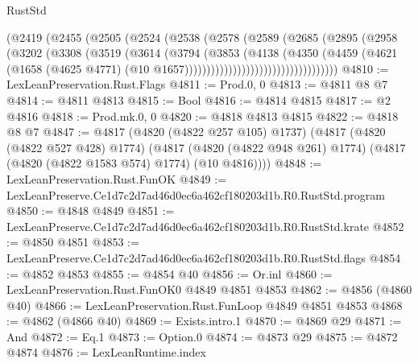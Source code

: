 \begin{lexlean}{RustStd}
\begin{coremodule}
                              (@2419
                                (@2455
                                  (@2505
                                    (@2524
                                      (@2538
                                        (@2578
                                          (@2589
                                            (@2685
                                              (@2895
                                                (@2958
                                                  (@3202
                                                    (@3308
                                                      (@3519
                                                        (@3614
                                                          (@3794
                                                            (@3853
                                                              (@4138
                                                                (@4350
                                                                  (@4459
                                                                    (@4621
                                                                      (@1658
                                                                        (@4625 @4771)
                                                                        (@10
                                                                          @1657)))))))))))))))))))))))))))))))))))
@4810 := LexLeanPreservation.Rust.Flags
@4811 := Prod.{0, 0}
@4813 := @4811 @8 @7
@4814 := @4811 @4813
@4815 := Bool
@4816 := @4814 @4815
@4817 := @2 @4816
@4818 := Prod.mk.{0, 0}
@4820 := @4818 @4813 @4815
@4822 := @4818 @8 @7
@4847 := @4817
    (@4820 (@4822 @257 @105) @1737)
    (@4817
      (@4820 (@4822 @527 @428) @1774)
      (@4817 (@4820 (@4822 @948 @261) @1774) (@4817 (@4820 (@4822 @1583 @574) @1774) (@10 @4816))))
@4848 := LexLeanPreservation.Rust.FunOK
@4849 := LexLeanPreserve.Ce1d7c2d7ad46d0ec6a462cf180203d1b.R0.RustStd.program
@4850 := @4848 @4849
@4851 := LexLeanPreserve.Ce1d7c2d7ad46d0ec6a462cf180203d1b.R0.RustStd.krate
@4852 := @4850 @4851
@4853 := LexLeanPreserve.Ce1d7c2d7ad46d0ec6a462cf180203d1b.R0.RustStd.flags
@4854 := @4852 @4853
@4855 := @4854 @40
@4856 := Or.inl
@4860 := LexLeanPreservation.Rust.FunOK0 @4849 @4851 @4853
@4862 := @4856 (@4860 @40)
@4866 := LexLeanPreservation.Rust.FunLoop @4849 @4851 @4853
@4868 := @4862 (@4866 @40)
@4869 := Exists.intro.{1}
@4870 := @4869 @29
@4871 := And
@4872 := Eq.{1}
@4873 := Option.{0}
@4874 := @4873 @29
@4875 := @4872 @4874
@4876 := LexLeanRuntime.index

\end{coremodule}
\end{lexlean}
